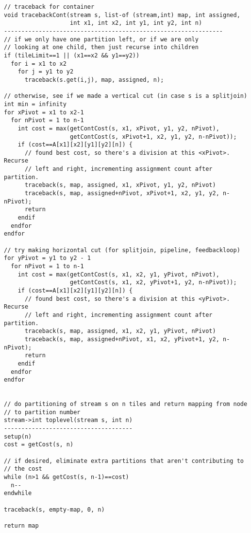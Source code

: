 \begin{verbatim}
// traceback for container
void tracebackCont(stream s, list-of (stream,int) map, int assigned, 
                   int x1, int x2, int y1, int y2, int n)
---------------------------------------------------------------
// if we only have one partition left, or if we are only
// looking at one child, then just recurse into children
if (tileLimit==1 || (x1==x2 && y1==y2))
  for i = x1 to x2
    for j = y1 to y2
      traceback(s.get(i,j), map, assigned, n);

// otherwise, see if we made a vertical cut (in case s is a splitjoin)
int min = infinity
for xPivot = x1 to x2-1
  for nPivot = 1 to n-1
    int cost = max(getContCost(s, x1, xPivot, y1, y2, nPivot),
                   getContCost(s, xPivot+1, x2, y1, y2, n-nPivot));
    if (cost==A[x1][x2][y1][y2][n]) {
      // found best cost, so there's a division at this <xPivot>.  Recurse
      // left and right, incrementing assignment count after partition.
      traceback(s, map, assigned, x1, xPivot, y1, y2, nPivot)
      traceback(s, map, assigned+nPivot, xPivot+1, x2, y1, y2, n-nPivot);
      return
    endif
  endfor
endfor

// try making horizontal cut (for splitjoin, pipeline, feedbackloop)
for yPivot = y1 to y2 - 1
  for nPivot = 1 to n-1
    int cost = max(getContCost(s, x1, x2, y1, yPivot, nPivot),
                   getContCost(s, x1, x2, yPivot+1, y2, n-nPivot));
    if (cost==A[x1][x2][y1][y2][n]) {
      // found best cost, so there's a division at this <yPivot>.  Recurse
      // left and right, incrementing assignment count after partition.
      traceback(s, map, assigned, x1, x2, y1, yPivot, nPivot)
      traceback(s, map, assigned+nPivot, x1, x2, yPivot+1, y2, n-nPivot);
      return
    endif
  endfor
endfor


// do partitioning of stream s on n tiles and return mapping from node
// to partition number
stream->int toplevel(stream s, int n)
-------------------------------------
setup(n)
cost = getCost(s, n)

// if desired, eliminate extra partitions that aren't contributing to
// the cost
while (n>1 && getCost(s, n-1)==cost)
  n--
endwhile

traceback(s, empty-map, 0, n)

return map

\end{verbatim}
